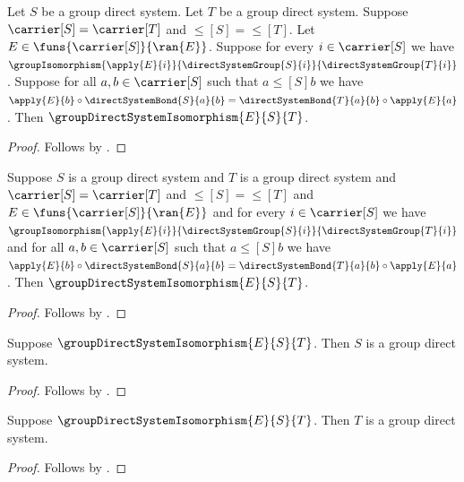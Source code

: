 \begin{proposition}\label{group_direct_system_isomorphism_intro}
    Let $S$ be a group direct system.
    Let $T$ be a group direct system.
    Suppose $\carrier[S]=\carrier[T]$ and
        $\leq[S]=\leq[T]$.
    Let $E\in\funs{\carrier[S]}{\ran{E}}$.
    Suppose for every $i\in\carrier[S]$ we have
        $\groupIsomorphism{\apply{E}{i}}
            {\directSystemGroup{S}{i}}{\directSystemGroup{T}{i}}$.
    Suppose for all $a,b\in\carrier[S]$ such that
        $a\mathrel{\leq[S]}b$ we have
        $\apply{E}{b}\circ\directSystemBond{S}{a}{b}=
            \directSystemBond{T}{a}{b}\circ\apply{E}{a}$.
    Then $\groupDirectSystemIsomorphism{E}{S}{T}$.
\end{proposition}
\begin{proof}
    Follows by .
\end{proof}

\begin{proposition}\label{group_direct_system_isomorphism_from_data}
    Suppose $S$ is a group direct system and
        $T$ is a group direct system and
        $\carrier[S]=\carrier[T]$ and $\leq[S]=\leq[T]$ and
        $E\in\funs{\carrier[S]}{\ran{E}}$ and
        for every $i\in\carrier[S]$ we have
            $\groupIsomorphism{\apply{E}{i}}
                {\directSystemGroup{S}{i}}
                {\directSystemGroup{T}{i}}$ and
        for all $a,b\in\carrier[S]$ such that
            $a\mathrel{\leq[S]}b$ we have
            $\apply{E}{b}\circ\directSystemBond{S}{a}{b}=
                \directSystemBond{T}{a}{b}\circ\apply{E}{a}$.
    Then $\groupDirectSystemIsomorphism{E}{S}{T}$.
\end{proposition}
\begin{proof}
    Follows by .
\end{proof}

\begin{proposition}\label{group_direct_system_isomorphism_source}
    Suppose $\groupDirectSystemIsomorphism{E}{S}{T}$.
    Then $S$ is a group direct system.
\end{proposition}
\begin{proof}
    Follows by .
\end{proof}

\begin{proposition}\label{group_direct_system_isomorphism_target}
    Suppose $\groupDirectSystemIsomorphism{E}{S}{T}$.
    Then $T$ is a group direct system.
\end{proposition}
\begin{proof}
    Follows by .
\end{proof}

